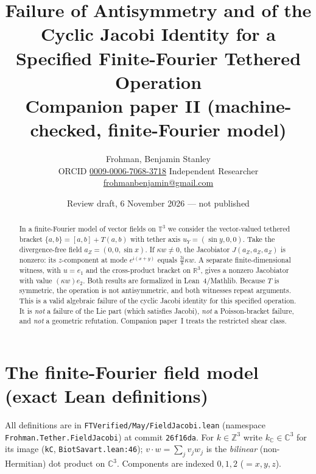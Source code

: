 \documentclass[11pt]{article}\emergencystretch=2em
\author{Frohman, Benjamin Stanley\\ \small ORCID \href{https://orcid.org/0009-0006-7068-3718}{0009-0006-7068-3718} \quad Independent Researcher \quad \href{mailto:frohmanbenjamin@gmail.com}{frohmanbenjamin@gmail.com}}
\date{Review draft, 6 November 2026 --- not published}
\title{Failure of Antisymmetry and of the Cyclic Jacobi Identity for a Specified Finite-Fourier Tethered Operation\\ \large Companion paper II (machine-checked, finite-Fourier model)}
\theoremstyle{definition}\newtheorem{definition}[theorem]{Definition}\theoremstyle{remark}\newtheorem{remark}[theorem]{Remark}
\newcommand{\ii}{\mathrm{i}}
\begin{document}
\maketitle
\begin{abstract}
In a finite-Fourier model of vector fields on $\mathbb T^3$ we consider the vector-valued tethered bracket $\{a,b\}=[a,b]+T(a,b)$ with tether axis $u_Y=(\sin y,0,0)$. Take the divergence-free field $a_Z=(0,0,\sin x)$. If $\kappa w\ne0$, the Jacobiator $J(a_Z,a_Z,a_Z)$ is nonzero: its $z$-component at mode $e^{\ii(x+y)}$ equals $\tfrac{3\ii}{8}\kappa w$. A separate finite-dimensional witness, with $u=e_1$ and the cross-product bracket on $\mathbb R^3$, gives a nonzero Jacobiator with value $(\kappa w)e_2$. Both results are formalized in Lean~4/Mathlib. Because $T$ is symmetric, the operation is not antisymmetric, and both witnesses repeat arguments. This is a valid algebraic failure of the cyclic Jacobi identity for this specified operation. It is \emph{not} a failure of the Lie part (which satisfies Jacobi), \emph{not} a Poisson-bracket failure, and \emph{not} a geometric refutation. Companion paper~I treats the restricted shear class.
\end{abstract}
\section{The finite-Fourier field model (exact Lean definitions)}
All definitions are in \texttt{FTVerified/May/FieldJacobi.lean} (namespace\\ \texttt{Frohman.Tether.FieldJacobi}) at commit \texttt{26f16da}. For $k\in\mathbb Z^3$ write $k_{\mathbb C}\in\mathbb C^3$ for its image (\texttt{kC}, \texttt{BiotSavart.lean:46}); $v\cdot w=\sum_{j}v_jw_j$ is the \emph{bilinear} (non-Hermitian) dot product on $\mathbb C^3$. Components are indexed $0,1,2$ ($=x,y,z$).
\end{document}
